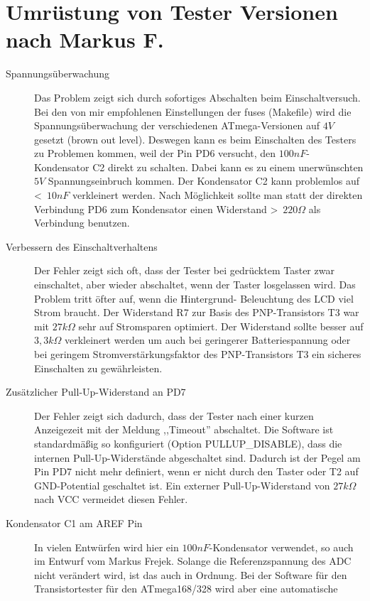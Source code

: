 \section{Umrüstung von Tester Versionen nach Markus F.}
\label{sec:change_markus}
\begin{description}

\item[Spannungsüberwachung]  
Das Problem zeigt sich durch sofortiges Abschalten beim Einschaltversuch.
Bei den von mir empfohlenen Einstellungen der fuses (Makefile) wird die Spannungsüberwachung der
verschiedenen ATmega-Versionen auf \(4V\) gesetzt (brown out level). Deswegen kann es beim
Einschalten des Testers zu Problemen kommen, weil der Pin PD6 versucht, den \(100nF\)-Kondensator C2
direkt zu schalten. Dabei kann es zu einem unerwünschten \(5V\) Spannungseinbruch kommen.
Der Kondensator C2 kann problemlos auf \textless~\(10nF\) verkleinert werden. Nach Möglichkeit sollte
man statt der direkten Verbindung PD6 zum Kondensator einen Widerstand \textgreater~\(220\Omega\) 
als Verbindung benutzen.
\item[Verbessern des Einschaltverhaltens]
Der Fehler zeigt sich oft, dass der Tester bei gedrücktem Taster zwar einschaltet, aber wieder
abschaltet, wenn der Taster losgelassen wird. Das Problem tritt öfter auf, wenn die Hintergrund-
Beleuchtung des LCD viel Strom braucht.
Der Widerstand R7 zur Basis des PNP-Transistors T3 war mit \(27k\Omega\) sehr auf Stromsparen
optimiert. Der Widerstand sollte besser auf \(3,3k\Omega\) verkleinert werden um auch bei
geringerer Batteriespannung oder bei geringem Stromverstärkungsfaktor des PNP-Transistors T3
ein sicheres Einschalten zu gewährleisten.
\item[Zusätzlicher Pull-Up-Widerstand an PD7]
Der Fehler zeigt sich dadurch, dass der Tester nach einer kurzen Anzeigezeit mit der Meldung
,,Timeout'' abschaltet. Die Software ist standardmäßig so konfiguriert (Option PULLUP\_DISABLE),
dass die internen Pull-Up-Widerstände abgeschaltet sind.
Dadurch ist der Pegel am Pin PD7 nicht mehr definiert,
wenn er nicht durch den Taster oder T2 auf GND-Potential geschaltet ist. Ein externer
Pull-Up-Widerstand von \(27k\Omega\) nach VCC vermeidet diesen Fehler.
\item[Kondensator C1 am AREF Pin]
In vielen Entwürfen wird hier ein \(100nF\)-Kondensator verwendet, so auch im Entwurf vom Markus Frejek.
Solange die Referenzspannung des ADC nicht verändert wird, ist das auch in Ordnung.
Bei der Software für den Transistortester für den ATmega168/328 wird aber eine automatische

\end{description}
